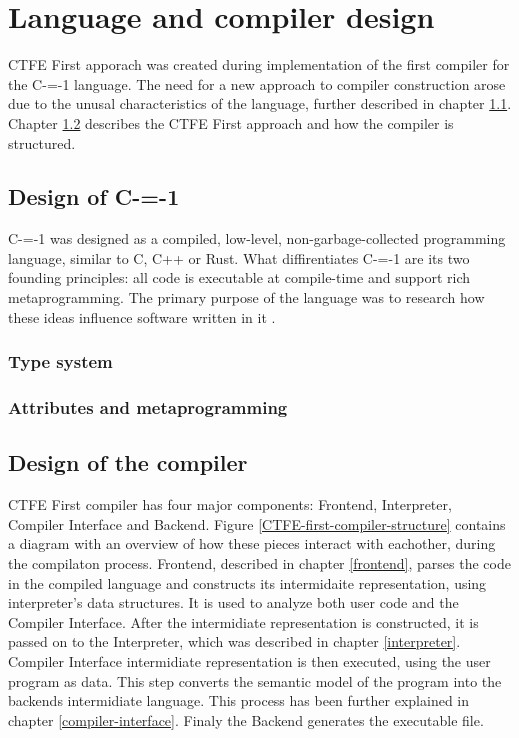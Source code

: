 \section{Language and compiler design}
\label{language-compiler-design}

CTFE First apporach was created during implementation of the first compiler for the C-=-1 language\cite{grabski2022compilation}.
The need for a new approach to compiler construction arose due to the unusal characteristics of the language, further described in chapter \ref{language-design}.
Chapter \ref{compiler-design} describes the CTFE First approach and how the compiler is structured. 

\subsection{Design of C-=-1}
\label{language-design}

C-=-1 was designed as a compiled, low-level, non-garbage-collected programming language, similar to C, C++ or Rust.
What diffirentiates C-=-1 are its two founding principles: all code is executable at compile-time and support rich metaprogramming.
The primary purpose of the language was to research how these ideas influence software written in it \cite{grabski2022compilation}.

\subsubsection{Type system}

\subsubsection{Attributes and metaprogramming}

\subsection{Design of the compiler}
\label{compiler-design}

CTFE First compiler has four major components: Frontend, Interpreter, Compiler Interface and Backend.
Figure \ref{CTFE-first-compiler-structure} contains a diagram with an overview of how these pieces interact with eachother, during the compilaton process.
Frontend, described in chapter \ref{frontend}, parses the code in the compiled language and constructs its intermidaite representation, using interpreter's data structures.
It is used to analyze both user code and the Compiler Interface.
After the intermidiate representation is constructed, it is passed on to the Interpreter, which was described in chapter \ref{interpreter}.
Compiler Interface intermidiate representation is then executed, using the user program as data. 
This step converts the semantic model of the program into the backends intermidiate language.
This process has been further explained in chapter \ref{compiler-interface}.
Finaly the Backend generates the executable file.

